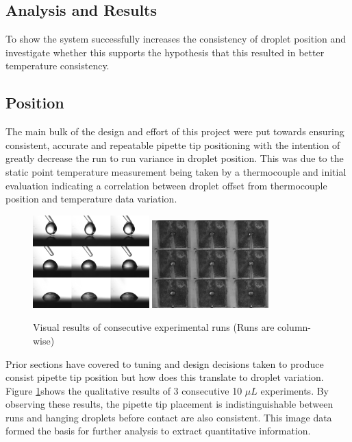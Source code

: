 \subsection{Analysis and Results}
To show the system successfully increases the consistency of droplet position and investigate whether this supports the hypothesis that this resulted in better temperature consistency.

\subsection{Position}

The main bulk of the design and effort of this project were put towards ensuring consistent, accurate and repeatable pipette tip positioning with the intention of greatly decrease the run to run variance in droplet position. This was due to the static point temperature measurement being taken by a thermocouple and initial evaluation indicating a correlation between droplet offset from thermocouple position and temperature data variation.

\begin{figure}[h]
    \centering
    \includegraphics[width=0.4\textwidth]{img/side_drops.png}
    \includegraphics[width=0.4\textwidth]{img/top_drops.png}
    \caption{Visual results of consecutive experimental runs (Runs are column-wise)}
    \label{fig:drops_eval}
\end{figure}

Prior sections have covered to tuning and design decisions taken to produce consist pipette tip position but how does this translate to droplet variation. Figure  \ref{fig:drops_eval}shows the qualitative results of 3 consecutive 10 $\mu L$ experiments. By observing these results, the pipette tip placement is indistinguishable between runs and hanging droplets before contact are also consistent. This image data formed the basis for further analysis to extract quantitative information.

